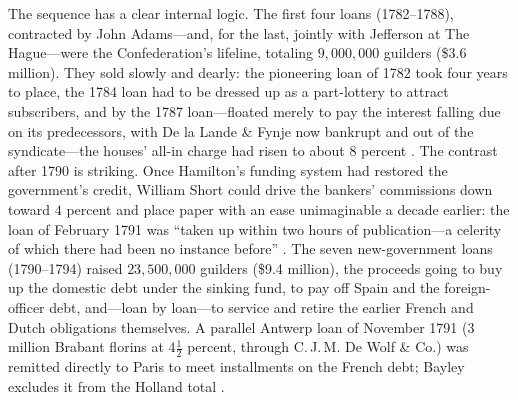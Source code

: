 \documentclass[12pt]{article}
\begin{document}
The sequence has a clear internal logic. The first four loans (1782--1788),
contracted by John Adams---and, for the last, jointly with Jefferson at The
Hague---were the Confederation's lifeline, totaling $9{,}000{,}000$ guilders
(\$3.6 million). They sold slowly and dearly: the pioneering loan of 1782 took
four years to place, the 1784 loan had to be dressed up as a part-lottery to
attract subscribers, and by the 1787 loan---floated merely to pay the interest
falling due on its predecessors, with De la Lande \& Fynje now bankrupt and out
of the syndicate---the houses' all-in charge had risen to about $8$ percent
\citep[310--316]{bayley1881national}. The contrast after 1790 is striking. Once
Hamilton's funding system had restored the government's credit, William Short
could drive the bankers' commissions down toward $4$ percent and place paper with
an ease unimaginable a decade earlier: the loan of February 1791 was ``taken up
within two hours of publication---a celerity of which there had been no instance
before'' \citep[317--318]{bayley1881national}. The seven new-government loans
(1790--1794) raised $23{,}500{,}000$ guilders (\$9.4 million), the proceeds going
to buy up the domestic debt under the sinking fund, to pay off Spain and the
foreign-officer debt, and---loan by loan---to service and retire the earlier
French and Dutch obligations themselves. A parallel Antwerp loan of November 1791
(3 million Brabant florins at $4\tfrac{1}{2}$ percent, through C.\,J.\,M. De Wolf
\& Co.) was remitted directly to Paris to meet installments on the French debt;
Bayley excludes it from the Holland total \citep[318--321]{bayley1881national}.
\end{document}
